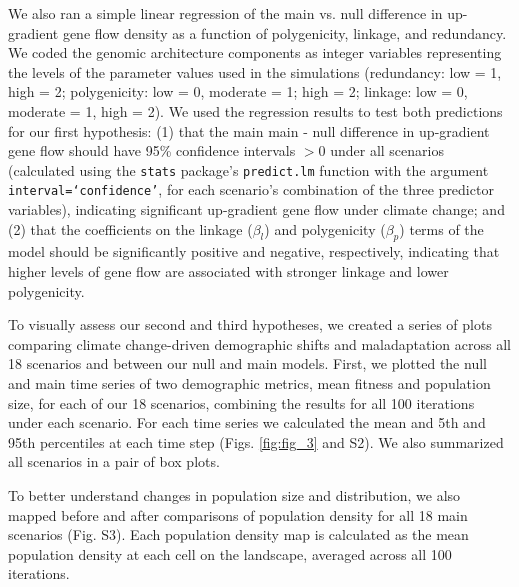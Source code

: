 \documentclass[9pt,twocolumn,twoside,lineno]{new_article}
\begin{document}
We also ran a simple linear regression
of the main vs. null difference in up-gradient gene flow density
as a function of polygenicity, linkage, and redundancy. We coded the genomic architecture components
as integer variables
representing the levels of the
parameter values used in the simulations (redundancy: low = 1, high = 2;
polygenicity: low = 0, moderate = 1; high = 2;
linkage: low = 0, moderate = 1, high = 2).
We used the regression results
to test both predictions for our first hypothesis: (1) that the main main - null difference in up-gradient gene flow
should have 95\% confidence intervals $>0$ under all scenarios
(calculated using the \texttt{stats} package's \texttt{predict.lm} function with
the argument \texttt{interval=`confidence'}, for each scenario's combination of the three predictor variables),
indicating significant up-gradient gene flow under climate change; and (2) that the coefficients on the linkage ($\beta_{l}$) and polygenicity ($\beta_{p}$)
terms of the model should be significantly positive and
negative, respectively, indicating that higher levels of gene flow are associated with stronger linkage and lower polygenicity.

To visually assess our second and third hypotheses, we created a series of
plots comparing climate change-driven demographic shifts
and maladaptation across all 18 scenarios and between our null and main models.
First, we plotted the 
null and main time series of two demographic
metrics, mean fitness and population size, for 
each of our 18 scenarios, combining the results for all 100 iterations under each scenario. For each time series we calculated the mean and 5th and 95th percentiles at each time step (Figs. \ref{fig:fig_3} and S2).
We also summarized all scenarios in a pair of box plots.

To better understand changes in population size and distribution,
we also mapped before and after comparisons of population density for all 18
main scenarios (Fig. S3).
Each population density map is calculated as
the mean population density at each cell on the landscape,
averaged across all 100 iterations.
\end{document}
